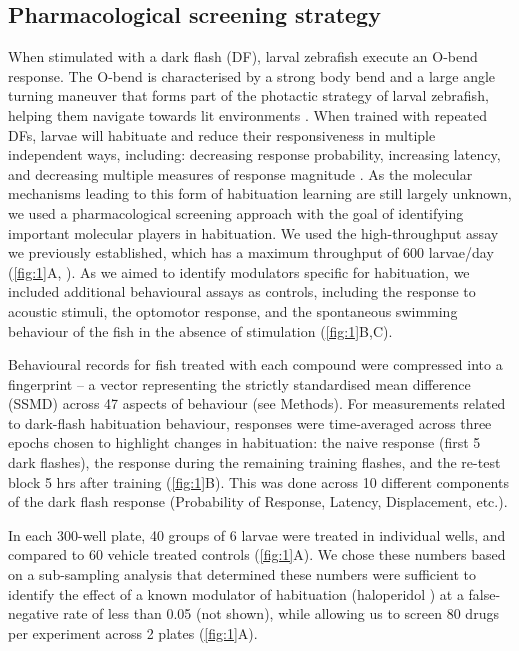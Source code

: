 \documentclass[9pt,lineno]{RandlettLab_elife}
\begin{document}
\subsection{Pharmacological screening strategy}

When stimulated with a dark flash (DF), larval zebrafish execute an O-bend response. The O-bend is characterised by a strong body bend and a large angle turning maneuver that forms part of the photactic strategy of larval zebrafish, helping them navigate towards lit environments \cite{Burgess2007-gq, Chen2014-qq}. When trained with repeated DFs, larvae will habituate and reduce their responsiveness in multiple independent ways, including: decreasing response probability, increasing latency, and decreasing multiple measures of response magnitude \cite{Randlett2019-fi}. As the molecular mechanisms leading to this form of habituation learning are still largely unknown, we used a pharmacological screening approach with the goal of identifying important molecular players in habituation. We used the high-throughput assay we previously established, which has a maximum throughput of 600 larvae/day (\autoref{fig:1}A, \cite{Randlett2019-fi}). As we aimed to identify modulators specific for habituation, we included additional behavioural assays as controls, including the response to acoustic stimuli, the optomotor response, and the spontaneous swimming behaviour of the fish in the absence of stimulation (\autoref{fig:1}B,C). 

Behavioural records for fish treated with each compound were compressed into a fingerprint \cite{Rihel2010-pj} -- a vector representing the strictly standardised mean difference (SSMD) across 47 aspects of behaviour (see Methods). For measurements related to dark-flash habituation behaviour, responses were time-averaged across three epochs chosen to highlight changes in habituation: the naive response (first 5 dark flashes), the response during the remaining training flashes, and the re-test block 5 hrs after training (\autoref{fig:1}B). This was done across 10 different components of the dark flash response (Probability of Response, Latency, Displacement, etc.). 


In each 300-well plate, 40 groups of 6 larvae were treated in individual wells, and compared to 60 vehicle treated controls (\autoref{fig:1}A). We chose these numbers based on a sub-sampling analysis that determined these numbers were sufficient to identify the effect of a known modulator of habituation (haloperidol \cite{Randlett2019-fi}) at a false-negative rate of less than 0.05 (not shown), while allowing us to screen 80 drugs per experiment across 2 plates (\autoref{fig:1}A). 
\end{document}
